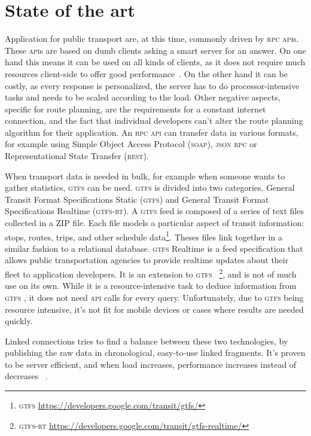 \documentclass[twocolumn]{phdsymp} %
\begin{document}
\section{State of the art}
Application for public transport are, at this time, commonly driven by \textsc{rpc} \textsc{api}s. These \textsc{api}s are based on dumb clients asking a smart server for an answer. On one hand this means it can be used on all kinds of clients, as it does not require much resources client-side to offer good performance~\cite{rpc}. On the other hand it can be costly, as every response is personalized, the server has to do processor-intensive tasks and needs to be scaled according to the load. Other negative aspects, specific for route planning, are the requirements for a constant internet connection, and the fact that individual developers can’t alter the route planning algorithm for their application. An \textsc{rpc} \textsc{api} can transfer data in various formats, for example using Simple Object Access Protocol (\textsc{soap}), \textsc{json} \textsc{rpc} or Representational State Transfer (\textsc{rest}). 

When transport data is needed in bulk, for example when someone wants to gather statistics, \textsc{gtfs}  can be used. \textsc{gtfs}  is divided into two categories, General Transit Format Specifications Static (\textsc{gtfs}) and General Transit Format Specifications Realtime (\textsc{gtfs-rt}). A \textsc{gtfs}  feed is composed of a series of text files collected in a ZIP file. Each file models a particular aspect of transit information: stops, routes, trips, and other schedule data\footnote{\textsc{gtfs} \url{https://developers.google.com/transit/gtfs/}}. Theses files link together in a similar fashion to a relational database. \textsc{gtfs}  Realtime is a feed specification that allows public transportation agencies to provide realtime updates about their fleet to application developers. It is an extension to \textsc{gtfs} ~\footnote{\textsc{gtfs-rt} \url{https://developers.google.com/transit/gtfs-realtime/}}, and is not of much use on its own.
While it is a resource-intensive task to deduce information from \textsc{gtfs} , it does not need \textsc{api} calls for every query. Unfortunately, due to \textsc{gtfs}  being resource intensive, it’s not fit for mobile devices or cases where results are needed quickly.

Linked connections tries to find a balance between these two technologies, by publishing the raw data in chronological, easy-to-use linked fragments. It’s proven to be server efficient, and when load increases, performance increases instead of decreases ~\cite{colpaert17}.
\end{document}

